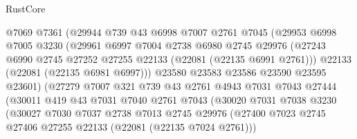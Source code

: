 \begin{lexlean}{RustCore}
\begin{coremodule}
                        @7069
                        @7361
                        (@29944
                          @739
                          @43
                          @6998
                          @7007
                          @2761
                          @7045
                          (@29953
                            @6998
                            @7005
                            @3230
                            (@29961
                              @6997
                              @7004
                              @2738
                              @6980
                              @2745
                              @29976
                              (@27243
                                @6990
                                @2745
                                @27252
                                @27255
                                @22133
                                (@22081 (@22135 @6991 @2761)))
                              @22133
                              (@22081 (@22135 @6981 @6997)))
                            @23580
                            @23583
                            @23586
                            @23590
                            @23595
                            @23601)
                          (@27279
                            @7007
                            @321
                            @739
                            @43
                            @2761
                            @4943
                            @7031
                            @7043
                            @27444
                            (@30011
                              @419
                              @43
                              @7031
                              @7040
                              @2761
                              @7043
                              (@30020
                                @7031
                                @7038
                                @3230
                                (@30027
                                  @7030
                                  @7037
                                  @2738
                                  @7013
                                  @2745
                                  @29976
                                  (@27400
                                    @7023
                                    @2745
                                    @27406
                                    @27255
                                    @22133
                                    (@22081 (@22135 @7024 @2761)))

\end{coremodule}
\end{lexlean}
